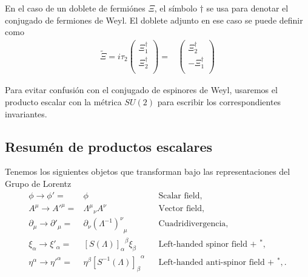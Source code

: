 En el caso de un doblete de fermiónes $\Xi$, el símbolo  $\dagger$ se usa para denotar el conjugado de fermiones de Weyl. El doblete adjunto en ese caso se puede definir como
\begin{align}
\label{eq:Xiadj}
 \widetilde{\Xi}=i\tau_2 \begin{pmatrix}
                  \Xi_1^{\dagger}\\
                  \Xi_2^{\dagger}\\
                \end{pmatrix}
=& \begin{pmatrix}
                  \Xi_2^{\dagger}\\
                 -\Xi_1^{\dagger}\\
                \end{pmatrix}
\end{align}

Para evitar confusión con el conjugado de espinores de Weyl, usaremos el producto escalar con la métrica $SU(2)$ para escribir los correspondientes invariantes.


\subsection{Resumén de productos escalares}

\begin{frame}
Tenemos los siguientes objetos que transforman bajo las representaciones del Grupo de Lorentz
\begin{align}
   \phi\to \phi'=&\phi && \text{Scalar field,}\nonumber\\
   A^\mu\to {A'}^\mu=&{\Lambda^\mu}_\nu A^\nu&&\text{Vector field,}\nonumber\\
  \partial_{\mu}\to \partial'_{\mu}=&\partial_{\nu} {\left( \Lambda^{-1} \right)^{\nu}}_{\mu}&&\text{Cuadridivergencia,}\nonumber\\
  \xi_\alpha\to\xi'_\alpha=&{\left[ S(\Lambda) \right]_\alpha}^\beta\xi_\beta
&& \text{Left-handed spinor field + ${}^{*}$,}\nonumber\\
\eta^{\alpha}\to {\eta'}^{\alpha} =&\eta^\beta{\left[  S^{-1}(\Lambda)  \right]_{\beta}}^{\alpha}&&
 \text{Left-handed anti-spinor field + ${}^{*}$,}\,.
 \end{align}
\end{frame}



